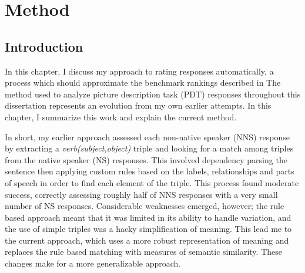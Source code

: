 \chapter{Method}
\label{chap:method}
%
%
%
%
%
%
%
%
%
%
%
%
\section{Introduction}
In this chapter, I discuss my approach to rating responses automatically, a process which should approximate the benchmark rankings described in The method used to analyze picture description task (PDT) responses throughout this dissertation represents an evolution from my own earlier attempts. In this chapter, I summarize this work and explain the current method.

In short, my earlier approach assessed each non-native speaker (NNS) response by extracting a \textit{verb(subject,object)} triple and looking for a match among triples from the native speaker (NS) responses. This involved dependency parsing the sentence then applying custom rules based on the labels, relationships and parts of speech in order to find each element of the triple. This process found moderate success, correctly assessing roughly half of NNS responses with a very small number of NS responses. Considerable weaknesses emerged, however; the rule based approach meant that it was limited in its ability to handle variation, and the use of simple triples was a hacky simplification of meaning. This lead me to the current approach, which uses a more robust representation of meaning and replaces the rule based matching with measures of semantic similarity. These changes make for a more generalizable approach.

